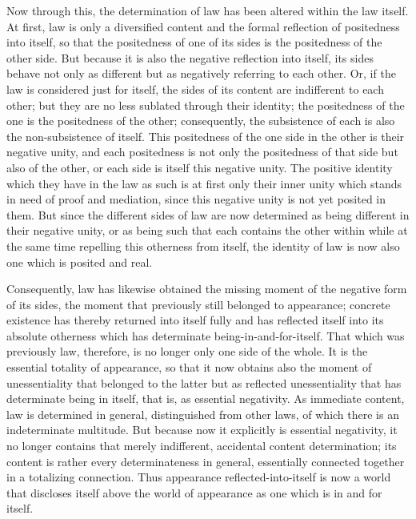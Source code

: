 Now through this, the determination of law 
has been altered within the law itself. 
At first, law is only a diversified content
and the formal reflection of positedness into itself,
so that the positedness of one of its sides is 
the positedness of the other side. 
But because it is also the negative reflection into itself, 
its sides behave not only as different 
but as negatively referring to each other.
Or, if the law is considered just for itself,
the sides of its content are indifferent to each other;
but they are no less sublated through their identity;
the positedness of the one is the positedness of the other;
consequently, the subsistence of each is
also the non-subsistence of itself.
This positedness of the one side in the other
is their negative unity,
and each positedness is not only the positedness 
of that side but also of the other,
or each side is itself this negative unity. 
The positive identity which they have in the law as such is
at first only their inner unity 
which stands in need of proof and mediation, 
since this negative unity is not yet posited in them.
But since the different sides of law are now determined 
as being different in their negative unity, 
or as being such that each contains the other within
while at the same time repelling this otherness from itself,
the identity of law is now also one which is posited and real.

Consequently, law has likewise obtained 
the missing moment of the negative form of its sides, 
the moment that previously still belonged to appearance; 
concrete existence has thereby returned into itself fully
and has reflected itself into its absolute otherness
which has determinate being-in-and-for-itself. 
That which was previously law, therefore, 
is no longer only one side of the whole. 
It is the essential totality of appearance, 
so that it now obtains also the moment of
unessentiality that belonged to the latter
but as reflected unessentiality 
that has determinate being in itself,
that is, as essential negativity.
As immediate content, law is determined in general,
distinguished from other laws,
of which there is an indeterminate multitude.
But because now it explicitly is essential negativity,
it no longer contains that merely 
indifferent, accidental content determination;
its content is rather every determinateness in general,
essentially connected together in a totalizing connection. 
Thus appearance reflected-into-itself is
now a world that discloses itself above 
the world of appearance as one
which is in and for itself.

